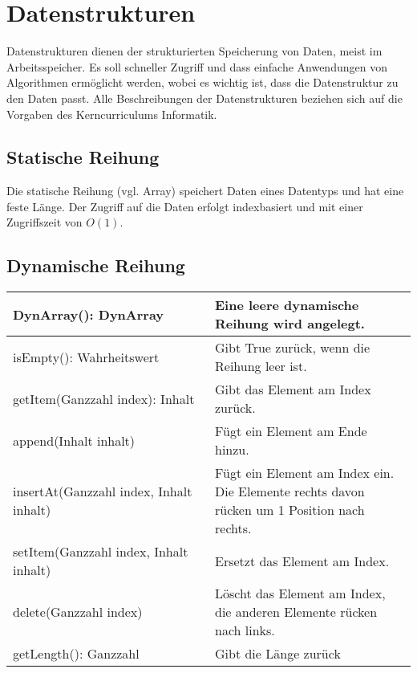 \section{Datenstrukturen}

Datenstrukturen dienen der strukturierten Speicherung von Daten, meist im Arbeitsspeicher.
Es soll schneller Zugriff und dass einfache Anwendungen von Algorithmen ermöglicht werden,
wobei es wichtig ist, dass die Datenstruktur zu den Daten passt.
Alle Beschreibungen der Datenstrukturen beziehen sich auf die Vorgaben des
Kerncurriculums Informatik.

\subsection{Statische Reihung}

Die statische Reihung (vgl. Array) speichert Daten eines Datentyps und hat
eine feste Länge. Der Zugriff auf die Daten erfolgt indexbasiert und
mit einer Zugriffszeit von $O(1)$.

\subsection{Dynamische Reihung}

\begin{table}[H]
    \begin{tabular}{|p{0.50\linewidth}|p{0.50\linewidth}|}
    \hline
    DynArray(): DynArray & Eine leere dynamische Reihung wird angelegt. \\ \hline
    isEmpty(): Wahrheitswert & Gibt True zurück, wenn die Reihung leer ist. \\ \hline
    getItem(Ganzzahl index): Inhalt & Gibt das Element am Index zurück. \\ \hline
    append(Inhalt inhalt) & Fügt ein Element am Ende hinzu. \\ \hline
    insertAt(Ganzzahl index, Inhalt inhalt) & Fügt ein Element am Index ein. Die Elemente rechts davon rücken um 1 Position nach rechts. \\ \hline
    setItem(Ganzzahl index, Inhalt inhalt) & Ersetzt das Element am Index. \\ \hline
    delete(Ganzzahl index) & Löscht das Element am Index, die anderen Elemente rücken nach links. \\ \hline
    getLength(): Ganzzahl & Gibt die Länge zurück \\ \hline
    \end{tabular}
\end{table}
























